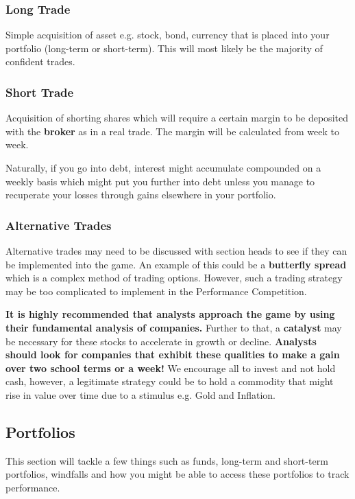 \documentclass[a4paper]{article}
\begin{document}
{\subsubsection{Long Trade}
Simple acquisition of asset e.g. stock, bond, currency that is placed into your portfolio (long-term or short-term). This will most likely be the majority of confident trades.

\subsubsection{Short Trade}
Acquisition of shorting shares which will require a certain margin to be deposited with the \textbf{broker} as in a real trade. The margin will be calculated from week to week.

\vspace{10pt}
Naturally, if you go into debt, interest might accumulate compounded on a weekly basis which might put you further into debt unless you manage to recuperate your losses through gains elsewhere in your portfolio.

\subsubsection{Alternative Trades}
Alternative trades may need to be discussed with section heads to see if they can be implemented into the game. An example of this could be a \textbf{butterfly spread} which is a complex method of trading options. However, such a trading strategy may be too complicated to implement in the Performance Competition.

\vspace{10pt}
\noindent \textbf{It is highly recommended that analysts approach the game by using their fundamental analysis of companies.} Further to that, a \textbf{catalyst} may be necessary for these stocks to accelerate in growth or decline. \textbf{Analysts should look for companies that exhibit these qualities to make a gain over two school terms or a week!} We encourage all to invest and not hold cash, however, a legitimate strategy could be to hold a commodity that might rise in value over time due to a stimulus e.g. Gold and Inflation.

\subsection{Portfolios}
This section will tackle a few things such as funds, long-term and short-term portfolios, windfalls and how you might be able to access these portfolios to track performance.
}
\end{document}
